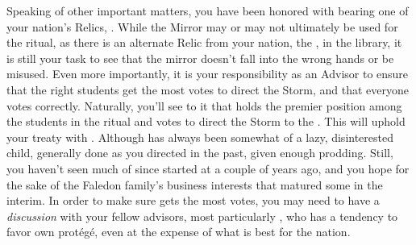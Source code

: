 \documentclass[char]{GL2020}
\begin{document}
Speaking of other important matters, you have been honored with bearing one of your nation's Relics, \iMirror{}. While the Mirror may or may not ultimately be used for the ritual, as there is an alternate Relic from your nation, the \iLariat{}, in the library, it is still your task to see that the mirror doesn't fall into the wrong hands or be misused. Even more importantly, it is your responsibility as an Advisor to ensure that the right students get the most votes to direct the Storm, and that everyone votes correctly. Naturally, you'll see to it that \cHeir{} holds the premier position among the \pTech{} students in the ritual and votes to direct the Storm to the \pShip{}. This will uphold your treaty with \pFarm{}. Although \cHeir{} has always been somewhat of a lazy, disinterested child, \cHeir{\they} \cHeir{\have} generally done as you directed in the past, given enough prodding. Still, you haven't seen much of \cHeir{\them} since \cHeir{\they} started at \pSchool{} a couple of years ago, and you hope for the sake of the Faledon family's business interests that \cHeir{\they} \cHeir{\have} matured some in the interim. In order to make sure \cHeir{} gets the most votes, you may need to have a \emph{discussion} with your fellow advisors, most particularly \cAntiChup{\full}, who has a tendency to favor \cAntiChup{\their} own protégé, even at the expense of what is best for the nation.  
\end{document}
